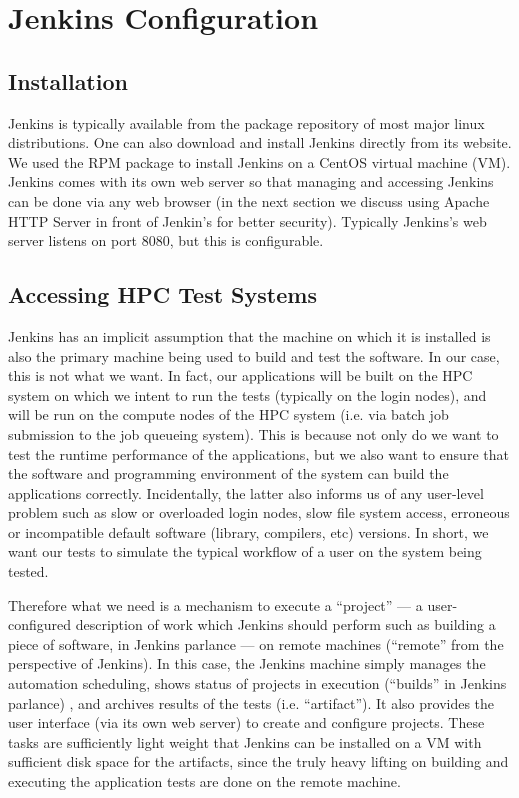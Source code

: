 \documentclass[10pt, conference, compsocconf]{IEEEtran}
\begin{document}
\section{Jenkins Configuration}
\label{sec:JenkinsConfiguration}

\subsection{Installation}
Jenkins is typically available from the package repository of most major linux distributions. 
One can also download and install Jenkins directly from its website. 
We used the RPM package to install Jenkins on a CentOS virtual machine (VM). 
Jenkins comes with its own web server so that managing and accessing Jenkins can be done via any web browser (in the next section we discuss using Apache HTTP Server in front of Jenkin's for better security). 
Typically Jenkins's web server listens on port 8080, but this is configurable. 


\subsection{Accessing HPC Test Systems}
Jenkins has an implicit assumption that the machine on which it is installed is also the primary machine being used to build and test the software. 
In our case, this is not what we want. 
In fact, our applications will be built on the HPC system on which we intent to run the tests (typically on the login nodes), and will be run on the compute nodes of the HPC system (i.e. via batch job submission to the job queueing system). 
This is because not only do we want to test the runtime performance of the applications, but we also want to ensure that the software and programming environment of the system can build the applications correctly. 
Incidentally, the latter also informs us of any user-level problem such as slow or overloaded login nodes, slow file system access, erroneous or incompatible default software (library, compilers, etc) versions. 
In short, we want our tests to simulate the typical workflow of a user on the system being tested.

Therefore what we need is a mechanism to execute a ``project'' --- a user-configured description of work which Jenkins should perform such as building a piece of software, in Jenkins parlance --- on remote machines (``remote'' from the perspective of Jenkins). 
In this case, the Jenkins machine simply manages the automation scheduling, shows status of projects in execution (``builds'' in Jenkins parlance) , and archives results of the tests (i.e. ``artifact''). 
It also provides the user interface (via its own web server) to create and configure projects. 
These tasks are sufficiently light weight that Jenkins can be installed on a VM with sufficient disk space for the artifacts, since the truly heavy lifting on building and executing the application tests are done on the remote machine.
\end{document}
